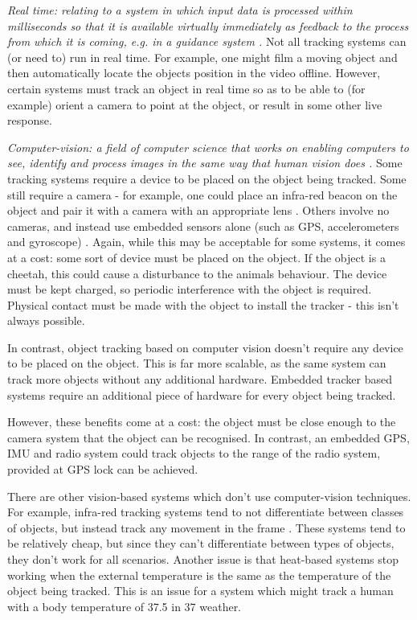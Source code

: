 \textit{Real time: relating to a system in which input data is processed within milliseconds so that it is available virtually immediately as feedback to the process from which it is coming, e.g. in a guidance system \cite{website:definition_real_time}.}
%
Not all tracking systems can (or need to) run in real time. For example, one might film a moving object and then automatically locate the objects position in the video offline. However, certain systems must track an object in real time so as to be able to (for example) orient a camera to point at the object, or result in some other live response.



\textit{Computer-vision: a field of computer science that works on enabling computers to see, identify and process images in the same way that human vision does \cite{website:definition_computer_vision}.}
%
Some tracking systems require a device to be placed on the object being tracked. Some still require a camera - for example, one could place an infra-red beacon on the object and pair it with a camera with an appropriate lens \cite{koyuncu2010survey}. Others involve no cameras, and instead use embedded sensors alone (such as GPS, accelerometers and gyroscope) \cite{sakpere2017state}. Again, while this may be acceptable for some systems, it comes at a cost: some sort of device must be placed on the object. If the object is a cheetah, this could cause a disturbance to the animals behaviour. The device must be kept charged, so periodic interference with the object is required. Physical contact must be made with the object to install the tracker - this isn't always possible.

In contrast, object tracking based on computer vision doesn't require any device to be placed on the object. This is far more scalable, as the same system can track more objects without any additional hardware. Embedded tracker based systems require an additional piece of hardware for every object being tracked.

However, these benefits come at a cost: the object must be close enough to the camera system that the object can be recognised. In contrast, an embedded GPS, IMU and radio system could track objects to the range of the radio system, provided at GPS lock can be achieved.

There are other vision-based systems which don't use computer-vision techniques. For example, infra-red tracking systems tend to not differentiate between classes of objects, but instead track any movement in the frame \cite{sakpere2017state}. These systems tend to be relatively cheap, but since they can't differentiate between types of objects, they don't work for all scenarios. Another issue is that heat-based systems stop working when the external temperature is the same as the temperature of the object being tracked. This is an issue for a system which might track a human with a body temperature of 37.5\textdegree{} in 37\textdegree{} weather.

